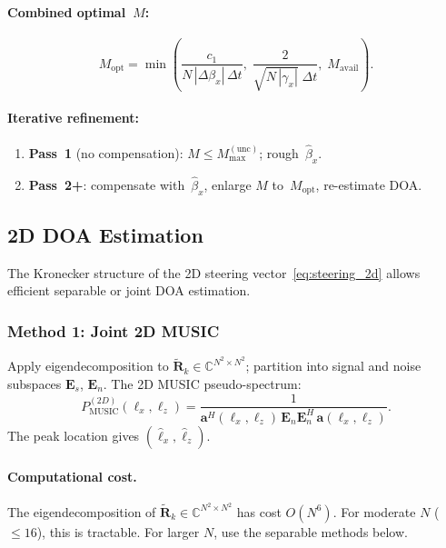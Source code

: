 \documentclass[11pt,a4paper]{article}
\newcommand{\C}{\mathbb{C}}
\begin{document}
\paragraph{Combined optimal~$M$:}
\begin{equation}
  \boxed{
  M_{\mathrm{opt}} = \min\!\left(
    \frac{c_1}{N\,|\Delta\beta_x|\,\Delta t},\;
    \frac{2}{\sqrt{N\,|\gamma_x|}\;\!\Delta t},\;
    M_{\mathrm{avail}}\right).}
  \label{eq:M_opt}
\end{equation}

\paragraph{Iterative refinement:}
\begin{enumerate}
  \item \textbf{Pass~1} (no compensation): $M\le M_{\max}^{(\mathrm{unc})}$;
    rough~$\hat{\beta}_x$.
  \item \textbf{Pass~2+}: compensate with~$\hat{\beta}_x$, enlarge $M$
    to~$M_{\mathrm{opt}}$, re-estimate DOA.
\end{enumerate}

\subsection{2D DOA Estimation}
\label{sec:2d_doa}

The Kronecker structure of the 2D steering
vector~\eqref{eq:steering_2d} allows efficient separable or joint
DOA estimation.

\subsubsection{Method 1: Joint 2D MUSIC}
\label{sec:2d_music}

Apply eigendecomposition to
$\tilde{\mathbf{R}}_k\in\C^{N^2\times N^2}$; partition into signal
and noise subspaces $\mathbf{E}_s$, $\mathbf{E}_n$.  The 2D MUSIC
pseudo-spectrum:
\begin{equation}
  P_{\mathrm{MUSIC}}^{(2D)}(\ell_x,\ell_z)
  = \frac{1}{\mathbf{a}^H(\ell_x,\ell_z)\,
  \mathbf{E}_n\mathbf{E}_n^H\,\mathbf{a}(\ell_x,\ell_z)}.
  \label{eq:music_2d}
\end{equation}
The peak location gives $(\hat{\ell}_x,\hat{\ell}_z)$.

\paragraph{Computational cost.}
The eigendecomposition of $\tilde{\mathbf{R}}_k\in\C^{N^2\times N^2}$
has cost $O(N^6)$.  For moderate $N$ ($\le 16$), this is tractable.
For larger $N$, use the separable methods below.
\end{document}
